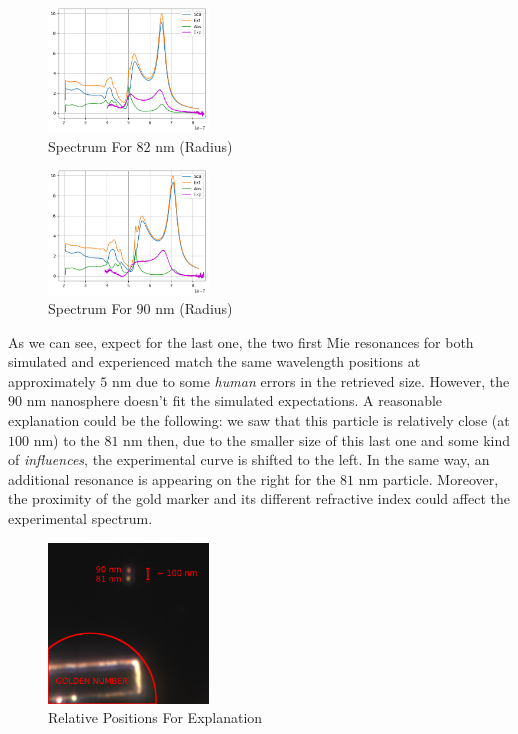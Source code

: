 \documentclass{article}
\numberwithin{equation}{section}
\begin{document}
\begin{figure}[h!]
    \centering
    \includegraphics[width=0.38\textwidth, height=0.28\textwidth]{result_82nm.png}
    \caption{Spectrum For $82$ nm (Radius)}
    \label{fig:result_82nm}
\end{figure}

\begin{figure}[h!]
    \centering
    \includegraphics[width=0.38\textwidth, height=0.28\textwidth]{result_90nm.png}
    \caption{Spectrum For $90$ nm (Radius)}
    \label{fig:result_90nm}
\end{figure}

As we can see, expect for the last one, the two first Mie resonances for both simulated and experienced match the same wavelength positions at approximately $5$ nm due to some \textit{human} errors in the retrieved size. However, the $90$ nm nanosphere doesn't fit the simulated expectations. A reasonable explanation could be the following: we saw that this particle is relatively close (at $100$ nm) to the $81$ nm then, due to the smaller size of this last one and some kind of \textit{influences}, the experimental curve is shifted to the left. In the same way, an additional resonance is appearing on the right for the $81$ nm particle. Moreover, the proximity of the gold marker and its different refractive index could affect the experimental spectrum.

\begin{figure}[h!]
    \centering
    \includegraphics[width=0.38\textwidth, height=0.30\textwidth]{curve_explanation.png}
    \caption{Relative Positions For Explanation}
    \label{fig:curve_explanation}
\end{figure}
\end{document}
